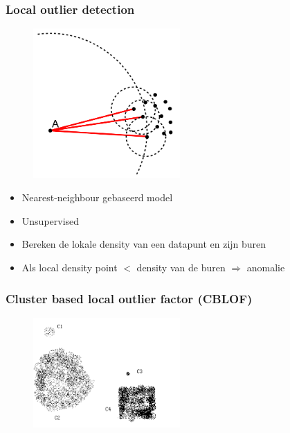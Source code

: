 \documentclass{article}
\begin{document}
\subsubsection{Local outlier detection}

\begin{figure}[H]
    \centering
    \includegraphics[width=0.5\textwidth]{local-outlier-factor.png}
\end{figure}

\begin{itemize}
    \item Nearest-neighbour gebaseerd model
    \item Unsupervised
    \item Bereken de lokale density van een datapunt en zijn buren
    \item Als local density point $<$ density van de buren $\Rightarrow$ anomalie
\end{itemize}

\subsubsection{Cluster based local outlier factor (CBLOF)}

\begin{figure}[H]
    \centering
    \includegraphics[width=0.5\textwidth]{cblof.png}
\end{figure}
\end{document}

